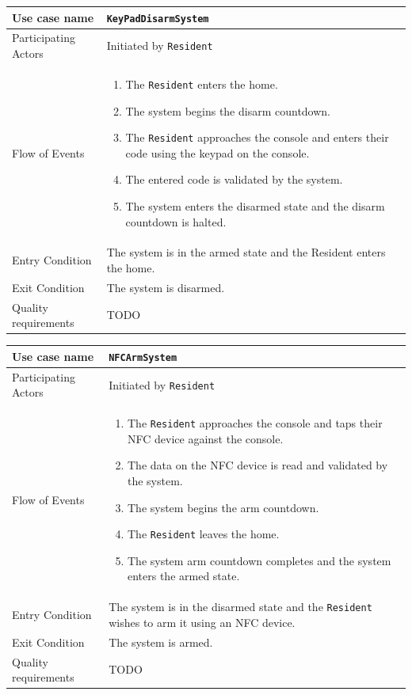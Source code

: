 \documentclass{report}
\begin{document}
\begin{tabular}{| l | p{7cm} |}
\hline
Use case name & \texttt{KeyPadDisarmSystem} \\ \hline
Participating Actors & Initiated by \texttt{Resident} \\ \hline
Flow of Events & 

\begin{enumerate}
 \item The \texttt{Resident} enters the home.
 \item The system begins the disarm countdown.
 \item The \texttt{Resident} approaches the console and enters their code using
       the keypad on the console.
 \item The entered code is validated by the system.
 \item The system enters the disarmed state and the disarm countdown is halted.
\end{enumerate}

\\ \hline

Entry Condition & The system is in the armed state and the Resident
enters the home. \\ \hline

Exit Condition & The system is disarmed. \\ \hline
Quality requirements & TODO \\ \hline

\hline
\end{tabular}

\begin{tabular}{| l | p{7cm} |}
\hline
Use case name & \texttt{NFCArmSystem} \\ \hline
Participating Actors & Initiated by \texttt{Resident} \\ \hline
Flow of Events & 

\begin{enumerate}
 \item The \texttt{Resident} approaches the console and taps their NFC device
       against the console.
 \item The data on the NFC device is read and validated by the system.
 \item The system begins the arm countdown.
 \item The \texttt{Resident} leaves the home.
 \item The system arm countdown completes and the system enters the armed state.
\end{enumerate}

\\ \hline

Entry Condition & The system is in the disarmed state and the \texttt{Resident}
wishes to arm it using an NFC device. \\ \hline

Exit Condition & The system is armed. \\ \hline
Quality requirements & TODO \\ \hline

\hline
\end{tabular}
\end{document}
